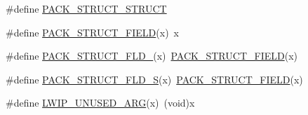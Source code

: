 \begin{DoxyCompactItemize}
\item 
\#define \hyperlink{group__compiler__abstraction_ga33623da05bb55497534c3dc26ebebeb2}{P\+A\+C\+K\+\_\+\+S\+T\+R\+U\+C\+T\+\_\+\+S\+T\+R\+U\+CT}
\item 
\#define \hyperlink{group__compiler__abstraction_gaab0b988124e37a978d9a88e7c1c778e0}{P\+A\+C\+K\+\_\+\+S\+T\+R\+U\+C\+T\+\_\+\+F\+I\+E\+LD}(x)~x
\item 
\#define \hyperlink{group__compiler__abstraction_gaa8f75e4117374c2d09fbda5566e40b62}{P\+A\+C\+K\+\_\+\+S\+T\+R\+U\+C\+T\+\_\+\+F\+L\+D\+\_}(x)~\hyperlink{group__compiler__abstraction_gaab0b988124e37a978d9a88e7c1c778e0}{P\+A\+C\+K\+\_\+\+S\+T\+R\+U\+C\+T\+\_\+\+F\+I\+E\+LD}(x)
\item 
\#define \hyperlink{group__compiler__abstraction_gacc89e224363eb0ebca24b64d925c3cb7}{P\+A\+C\+K\+\_\+\+S\+T\+R\+U\+C\+T\+\_\+\+F\+L\+D\+\_\+S}(x)~\hyperlink{group__compiler__abstraction_gaab0b988124e37a978d9a88e7c1c778e0}{P\+A\+C\+K\+\_\+\+S\+T\+R\+U\+C\+T\+\_\+\+F\+I\+E\+LD}(x)
\item 
\#define \hyperlink{group__compiler__abstraction_ga70624a5deb8b9199406372a7f3603ecf}{L\+W\+I\+P\+\_\+\+U\+N\+U\+S\+E\+D\+\_\+\+A\+RG}(x)~(void)x
\end{DoxyCompactItemize}

